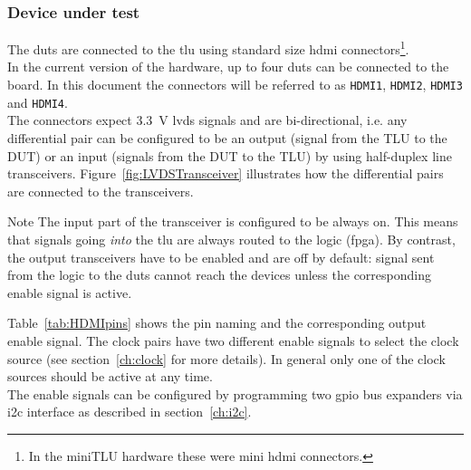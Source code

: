 \subsubsection{Device under test}\label{ch:dut}
The \gls{dut}s are connected to the \gls{tlu} using standard size \gls{hdmi} connectors\footnote{In the miniTLU hardware these were mini \gls{hdmi} connectors.}.\\
In the current version of the hardware, up to four \gls{dut}s can be connected to the board. In this document the connectors will be referred to as \verb|HDMI1|, \verb|HDMI2|, \verb|HDMI3| and \verb|HDMI4|.\\
The connectors expect 3.3~V \gls{lvds} signals and are bi-directional, i.e. any differential pair can be configured to be an output (signal from the TLU to the DUT) or an input (signals from the DUT to the TLU) by using half-duplex line transceivers. Figure~\ref{fig:LVDSTransceiver} illustrates how the differential pairs are connected to the transceivers.
\begin{alertinfo}{Note}
    The input part of the transceiver is configured to be always on. This means that signals going \emph{into} the \gls{tlu} are always routed to the logic (\gls{fpga}). By contrast, the output transceivers have to be enabled and are off by default: signal sent from the logic to the \gls{dut}s cannot reach the devices unless the corresponding enable signal is active.
\end{alertinfo}
Table~\ref{tab:HDMIpins} shows the pin naming and the corresponding output enable signal. The clock pairs have two different enable signals to select the clock source (see section~\ref{ch:clock} for more details). In general only one of the clock sources should be active at any time.\\
The enable signals can be configured by programming two \gls{gpio} bus expanders via \gls{i2c} interface as described in section~\ref{ch:i2c}.
